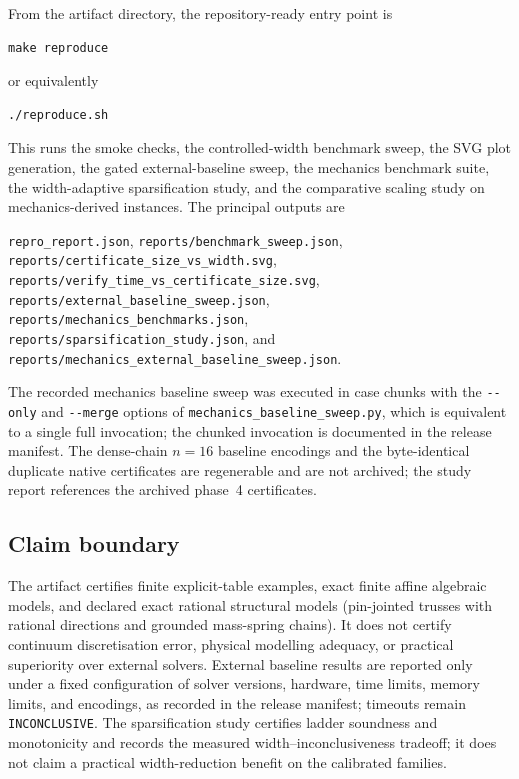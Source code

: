 From the artifact directory, the repository-ready entry point is
\begin{verbatim}
make reproduce
\end{verbatim}
or equivalently
\begin{verbatim}
./reproduce.sh
\end{verbatim}
This runs the smoke checks, the controlled-width benchmark sweep, the SVG plot
generation, the gated external-baseline sweep, the mechanics benchmark suite,
the width-adaptive sparsification study, and the comparative scaling study on
mechanics-derived instances. The principal outputs are
\begin{center}
\texttt{repro\_report.json}, \texttt{reports/benchmark\_sweep.json},\\
\texttt{reports/certificate\_size\_vs\_width.svg},\\
\texttt{reports/verify\_time\_vs\_certificate\_size.svg},\\
\texttt{reports/external\_baseline\_sweep.json},\\
\texttt{reports/mechanics\_benchmarks.json},\\
\texttt{reports/sparsification\_study.json}, and\\
\texttt{reports/mechanics\_external\_baseline\_sweep.json}.
\end{center}
The recorded mechanics baseline sweep was executed in case chunks with the
\texttt{-{}-only} and \texttt{-{}-merge} options of
\texttt{mechanics\_baseline\_sweep.py}, which is equivalent to a single full
invocation; the chunked invocation is documented in the release manifest. The
dense-chain $n=16$ baseline encodings and the byte-identical duplicate native
certificates are regenerable and are not archived; the study report references
the archived phase~4 certificates.

\subsection{Claim boundary}

The artifact certifies finite explicit-table examples, exact finite affine
algebraic models, and declared exact rational structural models
(pin-jointed trusses with rational directions and grounded mass-spring
chains). It does not certify continuum discretisation error, physical
modelling adequacy, or practical superiority over external solvers. External
baseline results are reported only under a fixed configuration of solver
versions, hardware, time limits, memory limits, and encodings, as recorded in
the release manifest; timeouts remain \texttt{INCONCLUSIVE}. The
sparsification study certifies ladder soundness and monotonicity and records
the measured width--inconclusiveness tradeoff; it does not claim a practical
width-reduction benefit on the calibrated families.
